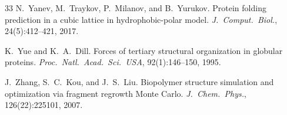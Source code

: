 \documentclass[11pt]{article}
\begin{document}
\begin{thebibliography}{33}
N.~Yanev, M.~Traykov, P.~Milanov, and B.~Yurukov.
Protein folding prediction in a cubic lattice in hydrophobic-polar model.
\emph{J.\ Comput.\ Biol.}, 24(5):412--421, 2017.

K.~Yue and K.~A.~Dill.
Forces of tertiary structural organization in globular proteins.
\emph{Proc.\ Natl.\ Acad.\ Sci.\ USA}, 92(1):146--150, 1995.

J.~Zhang, S.~C.~Kou, and J.~S.~Liu.
Biopolymer structure simulation and optimization via fragment regrowth Monte Carlo.
\emph{J.\ Chem.\ Phys.}, 126(22):225101, 2007.

\end{thebibliography}
\end{document}
